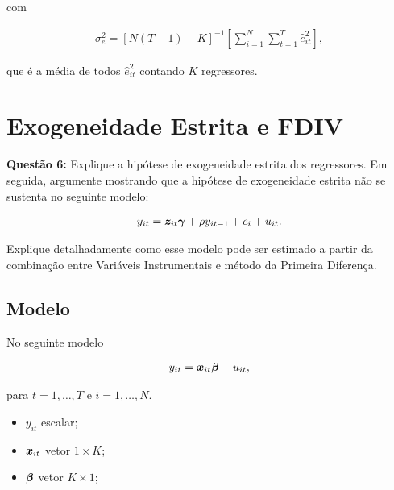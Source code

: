 \documentclass[11pt,oneside,a4paper]{article}
\numberwithin{equation}{section}
\begin{document}
\begin{description}
\begin{description}
\noindent 
com

\vspace{-1 em}
\begin{align*} 
\sigma^2_{e} = 
\left[ N ( T - 1 ) - K \right]^{-1}
\left[  
\sum_{i=1}^{N} 
\sum_{t=1}^{T}
\hat{e}_{it}^{2}
\right],
\end{align*}

\noindent
que é a média de todos $\hat{e}^{2}_{it}$ contando $K$ regressores.

\clearpage
\section{Exogeneidade Estrita e FDIV}

\noindent
\textbf{Questão 6:}
Explique a hipótese de exogeneidade estrita dos regressores.
Em seguida, argumente mostrando que a hipótese de exogeneidade estrita não se sustenta no seguinte modelo:

\vspace{-1.5 em}
\begin{align*}
y_{it} 
=
\boldsymbol{z}_{it} \boldsymbol{\gamma}
+
\rho y_{i t - 1}
+ 
c_{i} + u_{i t}.
\end{align*}
\vspace{-1.5 em}

Explique detalhadamente como esse modelo pode ser estimado a partir da combinação entre Variáveis Instrumentais e método da Primeira Diferença.

\subsection*{Modelo}

No seguinte modelo

\vspace{-1 em}
\begin{align*} 
	y_{it} = \boldsymbol{x}_{it} \boldsymbol{\beta} + u_{it},
\end{align*}

\noindent
para
$t = 1, \dots, T$ e $i = 1, \dots, N$.

\begin{itemize}\itemsep0pt
\item
$y_{it}$ escalar;

\item
$\boldsymbol{x}_{it}$  vetor $1 \times K$;

\item
$\boldsymbol{\beta}$ vetor $K \times 1$;


\end{itemize}
\end{description}
\end{description}
\end{document}
